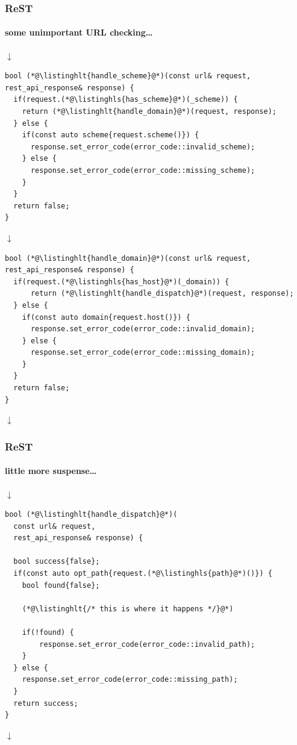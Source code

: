 \documentclass[compress,table,xcolor=table]{beamer}
\begin{document}
\begin{frame}[fragile]
  \frametitle{ReST}
  \framesubtitle{some unimportant URL checking\ldots}
  \smaller
  \centering $\downarrow$
  \begin{lstlisting}[language=c++2x,basicstyle=\tiny\ttfamily]
bool (*@\listinghlt{handle_scheme}@*)(const url& request, rest_api_response& response) {
  if(request.(*@\listinghls{has_scheme}@*)(_scheme)) {
    return (*@\listinghlt{handle_domain}@*)(request, response);
  } else {
    if(const auto scheme{request.scheme()}) {
      response.set_error_code(error_code::invalid_scheme);
    } else {
      response.set_error_code(error_code::missing_scheme);
    }
  }
  return false;
}
  \end{lstlisting}
  \centering $\downarrow$
  \begin{lstlisting}[language=c++2x,basicstyle=\tiny\ttfamily]
bool (*@\listinghlt{handle_domain}@*)(const url& request, rest_api_response& response) {
  if(request.(*@\listinghls{has_host}@*)(_domain)) {
      return (*@\listinghlt{handle_dispatch}@*)(request, response);
  } else {
    if(const auto domain{request.host()}) {
      response.set_error_code(error_code::invalid_domain);
    } else {
      response.set_error_code(error_code::missing_domain);
    }
  }
  return false;
}
  \end{lstlisting}
  \centering $\downarrow$
  \vfill
\end{frame}
\begin{frame}[fragile]
  \frametitle{ReST}
  \framesubtitle{little more suspense\ldots}
  \smaller
  \centering $\downarrow$
  \begin{lstlisting}[language=c++2x,basicstyle=\scriptsize\ttfamily]
bool (*@\listinghlt{handle_dispatch}@*)(
  const url& request,
  rest_api_response& response) {

  bool success{false};
  if(const auto opt_path{request.(*@\listinghls{path}@*)()}) {
    bool found{false};

    (*@\listinghlt{/* this is where it happens */}@*)

    if(!found) {
        response.set_error_code(error_code::invalid_path);
    }
  } else {
    response.set_error_code(error_code::missing_path);
  }
  return success;
}
  \end{lstlisting}
  \centering $\downarrow$
  \vfill
\end{frame}
\end{document}
